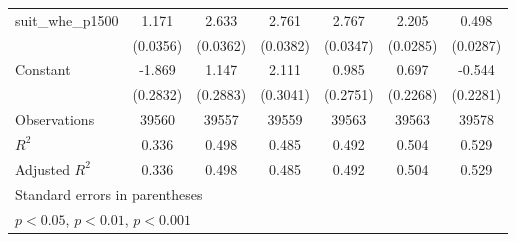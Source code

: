 {\begin{tabular}{l*{6}{c}}
\addlinespace
suit\_whe\_p1500      &       1.171\sym{***}&       2.633\sym{***}&       2.761\sym{***}&       2.767\sym{***}&       2.205\sym{***}&       0.498\sym{***}\\
                    &    (0.0356)         &    (0.0362)         &    (0.0382)         &    (0.0347)         &    (0.0285)         &    (0.0287)         \\
\addlinespace
Constant            &      -1.869\sym{***}&       1.147\sym{***}&       2.111\sym{***}&       0.985\sym{***}&       0.697\sym{**} &      -0.544\sym{*}  \\
                    &    (0.2832)         &    (0.2883)         &    (0.3041)         &    (0.2751)         &    (0.2268)         &    (0.2281)         \\
\midrule
Observations        &       39560         &       39557         &       39559         &       39563         &       39563         &       39578         \\
\(R^{2}\)           &       0.336         &       0.498         &       0.485         &       0.492         &       0.504         &       0.529         \\
Adjusted \(R^{2}\)  &       0.336         &       0.498         &       0.485         &       0.492         &       0.504         &       0.529         \\
\bottomrule
\multicolumn{7}{l}{\footnotesize Standard errors in parentheses}\\
\multicolumn{7}{l}{\footnotesize \sym{*} \(p<0.05\), \sym{**} \(p<0.01\), \sym{***} \(p<0.001\)}\\
\end{tabular}
}
